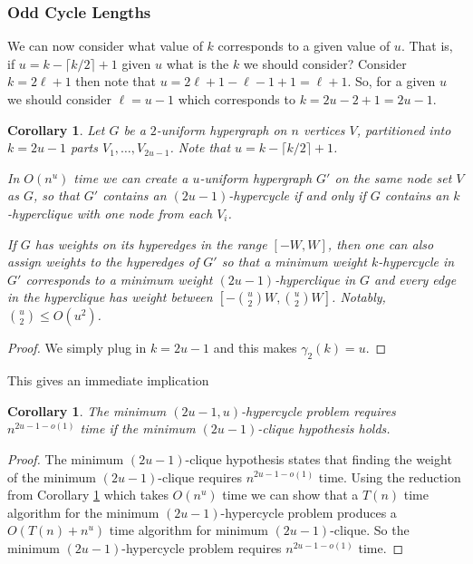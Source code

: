 \documentclass[11pt,letterpaper,pdftex]{article}
\newtheorem{corollary}[theorem]{Corollary}
\begin{document}
\subsubsection{Odd Cycle Lengths}
We can now consider what value of $k$ corresponds to a given value of $u$. That is, if $u = k- \lceil k/2 \rceil +1$ given $u$ what is the $k$ we should consider? Consider $k=2\ell +1$ then note that $u = 2\ell+1 - \ell -1+1 = \ell +1$. So, for a given $u$ we should consider $\ell = u-1$ which corresponds to $k = 2u-2+1 =  2u-1$.

\begin{corollary}
    Let $G$ be a $2$-uniform hypergraph on $n$ vertices $V$, partitioned into $k = 2u-1$ parts $V_1,\ldots,V_{2u-1}$. Note that $u=k-\lceil k/2\rceil +1$.
    
    In $O(n^{u})$ time we can create a $u$-uniform hypergraph $G'$ on the same node set $V$ as $G$, so that $G'$ contains an $(2u-1)$-hypercycle if and only if $G$ contains an $k$-hyperclique with one node from each $V_i$.
    
    If $G$ has weights on its hyperedges in the range $[-W,W]$, then one can also assign weights to the hyperedges of $G'$ so that a minimum weight $k$-hypercycle in $G'$ corresponds to a minimum weight $(2u-1)$-hyperclique in $G$ and every edge in the hyperclique has weight between $[-\binom{u}{2}W,\binom{u}{2}W]$. Notably, $\binom{u}{2}\leq O(u^2)$.
    \label{cor:reverseUandKMin}
\end{corollary}
\begin{proof}
We simply plug in $k = 2u-1$ and this makes $\gamma_2(k)=u$.
\end{proof}

This gives an immediate implication 

\begin{corollary}
The minimum $(2u-1,u)$-hypercycle problem requires $n^{2u-1-o(1)}$ time if the minimum $(2u-1)$-clique hypothesis holds. 
\label{cor:min2u-1ishard}
\end{corollary}
\begin{proof}
    The minimum $(2u-1)$-clique hypothesis states that finding the weight of the minimum $(2u-1)$-clique requires $n^{2u-1-o(1)}$ time. Using the reduction from Corollary \ref{cor:reverseUandKMin} which takes $O(n^{u})$ time we can show that a $T(n)$ time algorithm for the minimum $(2u-1)$-hypercycle problem produces a $O(T(n) + n^u)$ time algorithm for minimum $(2u-1)$-clique. So the minimum $(2u-1)$-hypercycle problem requires $n^{2u-1-o(1)}$ time.
\end{proof}
\end{document}
